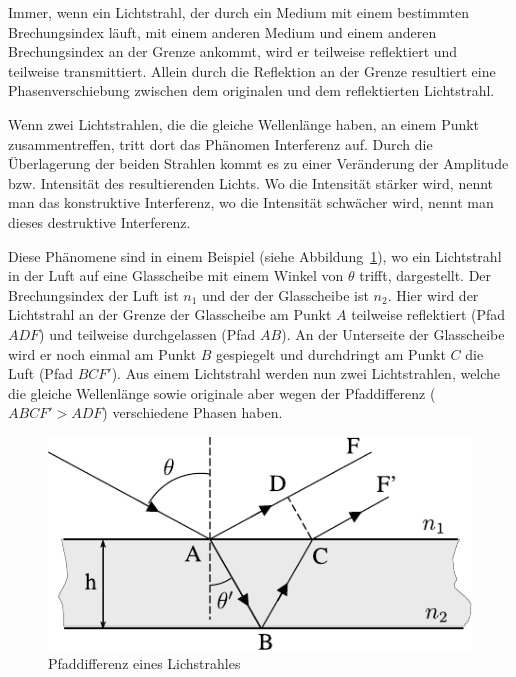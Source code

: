 Immer, wenn ein Lichtstrahl, der durch ein Medium mit einem bestimmten Brechungsindex läuft, mit einem anderen Medium und einem anderen Brechungsindex an der Grenze ankommt, wird er teilweise reflektiert und teilweise transmittiert.
Allein durch die Reflektion an der Grenze resultiert eine Phasenverschiebung zwischen dem originalen und dem reflektierten Lichtstrahl.

Wenn zwei Lichtstrahlen, die die gleiche Wellenlänge haben, an einem Punkt zusammentreffen, tritt dort das Phänomen Interferenz auf.
Durch die Überlagerung der beiden Strahlen kommt es zu einer Veränderung der Amplitude bzw. Intensität des resultierenden Lichts.
Wo die Intensität stärker wird, nennt man das konstruktive Interferenz, wo die Intensität schwächer wird, nennt man dieses destruktive Interferenz.

Diese Phänomene sind in einem Beispiel (siehe Abbildung~\ref{fig:pfadabweichung_des_lichtstrahls}), wo ein Lichtstrahl in der Luft auf eine Glasscheibe mit einem Winkel von $\theta$ trifft, dargestellt.
Der Brechungsindex der Luft ist $n_1$ und der der Glasscheibe ist $n_2$.
Hier wird der Lichtstrahl an der Grenze der Glasscheibe am Punkt $A$ teilweise reflektiert (Pfad $ADF$) und teilweise durchgelassen (Pfad $AB$).
An der Unterseite der Glasscheibe wird er noch einmal am Punkt $B$ gespiegelt und durchdringt am Punkt $C$ die Luft (Pfad $BCF'$).
Aus einem Lichtstrahl werden nun zwei Lichtstrahlen, welche die gleiche Wellenlänge sowie originale aber wegen der Pfaddifferenz ($ABCF' > ADF$) verschiedene Phasen haben.

\begin{figure}[htb]
    \centering
    \includegraphics[]{./images/licht_interferenz_furtuna.pdf}
    \caption{Pfaddifferenz eines Lichstrahles~\cite{furtuna_2011}}
    \label{fig:pfadabweichung_des_lichtstrahls}
\end{figure}


